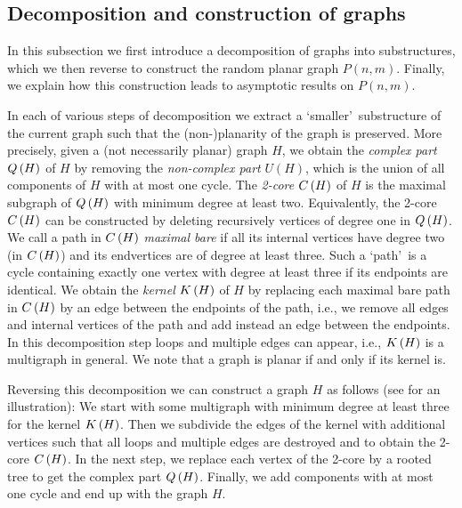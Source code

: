 \subsection{Decomposition and construction of graphs}\label{sub:decomposition_construction}
In this subsection we first introduce a decomposition of graphs into substructures, which we then reverse to construct the random planar graph $P(n,m)$. Finally, we explain how this construction leads to asymptotic results on $P(n,m)$.

In each of various steps of decomposition we extract a \lq smaller\rq\ substructure of the current graph such that the (non-)planarity of the graph is preserved. More precisely, given a (not necessarily planar) graph $H$, we obtain the {\em complex part} $Q\left(H\right)$ of $H$ by removing the {\em non-complex part} $U(H)$, which is the union of all components of $H$ with at most one cycle. The {\em 2-core} $C\left(H\right)$ of $H$ is the maximal subgraph of $Q\left(H\right)$ with minimum degree at least two. Equivalently, the 2-core $C\left(H\right)$ can be constructed by deleting recursively vertices of degree one in $Q\left(H\right)$. We call a path in $C\left(H\right)$ {\em maximal bare} if all its internal vertices have degree two (in $C\left(H\right)$) and its endvertices are of degree at least three. Such a \lq path\rq\ is a cycle containing exactly one vertex with degree at least three if its endpoints are identical. We obtain the {\em kernel} $K\left(H\right)$ of $H$ by replacing each maximal bare path in $C\left(H\right)$ by an edge between the endpoints of the path, i.e., we remove all edges and internal vertices of the path and add instead an edge between the endpoints. In this decomposition step loops and multiple edges can appear, i.e., $K\left(H\right)$ is a multigraph in general. We note that a graph is planar if and only if its kernel is.

Reversing this decomposition we can construct a graph $H$ as follows (see  for an illustration): We start with some multigraph with minimum degree at least three for the kernel $K\left(H\right)$. Then we subdivide the edges of the kernel with additional vertices such that all loops and multiple edges are destroyed and to obtain the 2-core $C\left(H\right)$. In the next step, we replace each vertex of the 2-core by a rooted tree to get the complex part $Q\left(H\right)$. Finally, we add components with at most one cycle and end up with the graph $H$.


\def\shiftXa{15.6}
\def\shiftYa{0}
\def\shiftXb{10.4}
\def\shiftYb{0}
\def\shiftXc{5.2}
\def\shiftYc{0}
\def\shiftXd{0}
\def\shiftYd{0}

